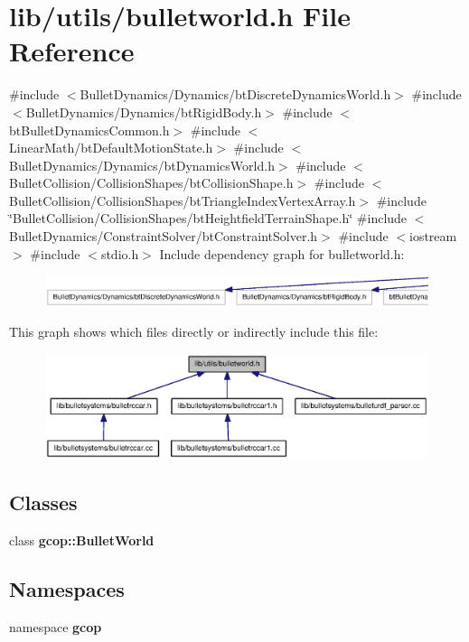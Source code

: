 \section{lib/utils/bulletworld.h \-File \-Reference}
\label{bulletworld_8h}
{\ttfamily \#include $<$\-Bullet\-Dynamics/\-Dynamics/bt\-Discrete\-Dynamics\-World.\-h$>$}\*
{\ttfamily \#include $<$\-Bullet\-Dynamics/\-Dynamics/bt\-Rigid\-Body.\-h$>$}\*
{\ttfamily \#include $<$bt\-Bullet\-Dynamics\-Common.\-h$>$}\*
{\ttfamily \#include $<$\-Linear\-Math/bt\-Default\-Motion\-State.\-h$>$}\*
{\ttfamily \#include $<$\-Bullet\-Dynamics/\-Dynamics/bt\-Dynamics\-World.\-h$>$}\*
{\ttfamily \#include $<$\-Bullet\-Collision/\-Collision\-Shapes/bt\-Collision\-Shape.\-h$>$}\*
{\ttfamily \#include $<$\-Bullet\-Collision/\-Collision\-Shapes/bt\-Triangle\-Index\-Vertex\-Array.\-h$>$}\*
{\ttfamily \#include \char`\"{}\-Bullet\-Collision/\-Collision\-Shapes/bt\-Heightfield\-Terrain\-Shape.\-h\char`\"{}}\*
{\ttfamily \#include $<$\-Bullet\-Dynamics/\-Constraint\-Solver/bt\-Constraint\-Solver.\-h$>$}\*
{\ttfamily \#include $<$iostream$>$}\*
{\ttfamily \#include $<$stdio.\-h$>$}\*
\-Include dependency graph for bulletworld.\-h\-:\nopagebreak
\begin{figure}[H]
\begin{center}
\leavevmode
\includegraphics[width=350pt]{bulletworld_8h__incl}
\end{center}
\end{figure}
\-This graph shows which files directly or indirectly include this file\-:
\nopagebreak
\begin{figure}[H]
\begin{center}
\leavevmode
\includegraphics[width=350pt]{bulletworld_8h__dep__incl}
\end{center}
\end{figure}
\subsection*{\-Classes}
\begin{DoxyCompactItemize}
\item 
class {\bf gcop\-::\-Bullet\-World}
\end{DoxyCompactItemize}
\subsection*{\-Namespaces}
\begin{DoxyCompactItemize}
\item 
namespace {\bf gcop}
\end{DoxyCompactItemize}
